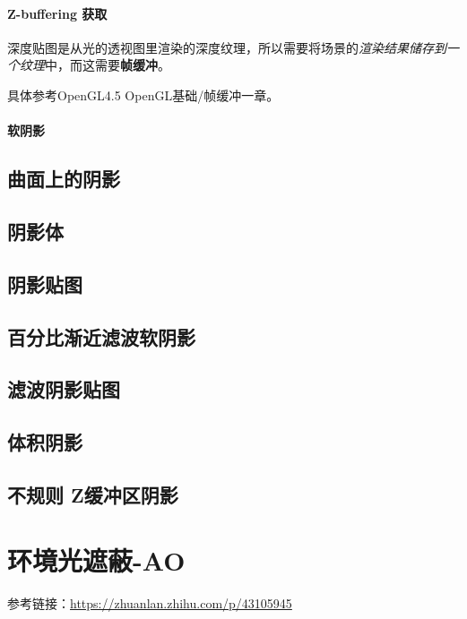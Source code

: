 \documentclass[UTF8,a4paper,12pt]{ctexbook}
\begin{document}
			\paragraph{Z-buffering 获取}
				深度贴图是从光的透视图里渲染的深度纹理，所以需要将场景的\textit{渲染结果储存到一个纹理}中，而这需要\textbf{帧缓冲}。
					
				具体参考OpenGL4.5 OpenGL基础/帧缓冲一章。
			
			\paragraph{软阴影}
			
			
		
		\subsection{曲面上的阴影}
		
		
		\subsection{阴影体}
		
		
		\subsection{阴影贴图}
		
		
		\subsection{百分比渐近滤波软阴影}
		
		
		\subsection{滤波阴影贴图}
		
		
		\subsection{体积阴影}
		
		
		\subsection{不规则 Z缓冲区阴影}
		
	
	
	
	
	
	
	

	
	\section{环境光遮蔽-AO}	
		参考链接：\url{https://zhuanlan.zhihu.com/p/43105945}
	
\end{document}
